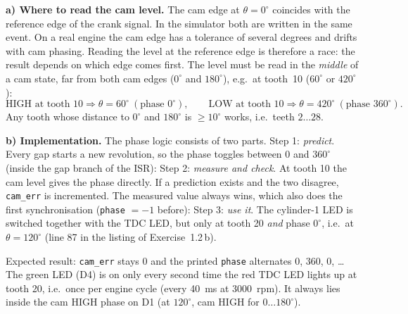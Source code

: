 \begin{solution}
\textbf{a) Where to read the cam level.} The cam edge at $\theta=0^\circ$
coincides with the reference edge of the crank signal. In the simulator both
are written in the same event. On a real engine the cam edge has a tolerance
of several degrees and drifts with cam phasing. Reading the level at the
reference edge is therefore a race: the result depends on which edge comes
first. The level must be read in the \emph{middle} of a cam state, far from
both cam edges ($0^\circ$ and $180^\circ$), e.g.\ at tooth~10 ($60^\circ$ or
$420^\circ$):
\[ \text{HIGH at tooth 10}\Rightarrow\theta=60^\circ\ (\text{phase }0^\circ),
   \qquad
   \text{LOW at tooth 10}\Rightarrow\theta=420^\circ\ (\text{phase }360^\circ). \]
Any tooth whose distance to $0^\circ$ and $180^\circ$ is $\ge10^\circ$ works,
i.e.\ teeth $2\dots28$.

\textbf{b) Implementation.} The phase logic consists of two parts.
Step 1: \emph{predict}. Every gap starts a new revolution, so the phase
toggles between 0 and $360^\circ$ (inside the gap branch of the ISR):
Step 2: \emph{measure and check}. At tooth 10 the cam level gives the phase
directly. If a prediction exists and the two disagree, \texttt{cam\_err} is
incremented. The measured value always wins, which also does the first
synchronisation (\texttt{phase} $=-1$ before):
Step 3: \emph{use it}. The cylinder-1 LED is switched together with the TDC
LED, but only at tooth 20 \emph{and} phase $0^\circ$, i.e.\ at $\theta=120^\circ$
(line 87 in the listing of Exercise~1.2\,b).

Expected result: \texttt{cam\_err} stays 0 and the printed \texttt{phase}
alternates 0, 360, 0, \dots{} The green LED (D4) is on only every second time
the red TDC LED lights up at tooth 20, i.e.\ once per engine cycle (every
\SI{40}{ms} at \SI{3000}{rpm}). It always lies inside the cam HIGH phase on
D1 (at $120^\circ$, cam HIGH for $0\dots180^\circ$).


\end{solution}
